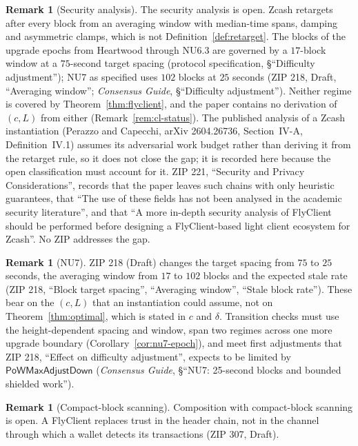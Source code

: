 \documentclass[11pt,a4paper]{article}
\theoremstyle{definition}
\newtheorem{remark}[theorem]{Remark}
\begin{document}
\begin{remark}[Security analysis]
The security analysis is open. Zcash retargets after every block from an
averaging window with median-time spans, damping and asymmetric clamps,
which is not Definition~\ref{def:retarget}. The blocks of the upgrade epochs
from Heartwood through NU6.3 are governed by a $17$-block window at a
$75$-second target spacing (protocol specification, \S``Difficulty
adjustment''); NU7 as specified uses $102$ blocks at $25$ seconds (ZIP 218,
Draft, ``Averaging window''; \emph{Consensus Guide}, \S``Difficulty adjustment''). Neither regime is covered by Theorem~\ref{thm:flyclient}, and the
paper contains no derivation of $(c, L)$ from either
(Remark~\ref{rem:cl-status}). The published analysis of a Zcash instantiation
(Perazzo and Capecchi, arXiv 2604.26736, Section~IV-A, Definition~IV.1) assumes
its adversarial work budget rather than deriving it from the retarget rule, so
it does not close the gap; it is recorded here because the open
classification must account for it. ZIP 221, ``Security and Privacy
Considerations'', records that the paper leaves such chains with only
heuristic guarantees, that ``The use of these fields has not been analysed
in the academic security literature'', and that ``A more in-depth security
analysis of FlyClient should be performed before designing a
FlyClient-based light client ecosystem for Zcash''. No ZIP addresses the
gap.
\end{remark}

\begin{remark}[NU7]
ZIP 218 (Draft) changes the target spacing from $75$ to $25$ seconds, the
averaging window from $17$ to $102$ blocks and the expected stale rate
(ZIP 218, ``Block target spacing'', ``Averaging window'', ``Stale block
rate''). These bear on the $(c, L)$ that an instantiation could assume, not
on Theorem~\ref{thm:optimal}, which is stated in $c$ and $\delta$. Transition
checks must use the height-dependent spacing and window, span two regimes
across one more upgrade boundary (Corollary~\ref{cor:nu7-epoch}), and meet
first adjustments that ZIP 218, ``Effect on difficulty adjustment'', expects
to be limited by $\mathsf{PoWMaxAdjustDown}$ (\emph{Consensus Guide},
\S``NU7: 25-second blocks and bounded shielded work'').
\end{remark}

\begin{remark}[Compact-block scanning]
Composition with compact-block scanning is open. A FlyClient replaces trust
in the header chain, not in the channel through which a wallet detects its
transactions (ZIP 307, Draft).
\end{remark}
\end{document}
